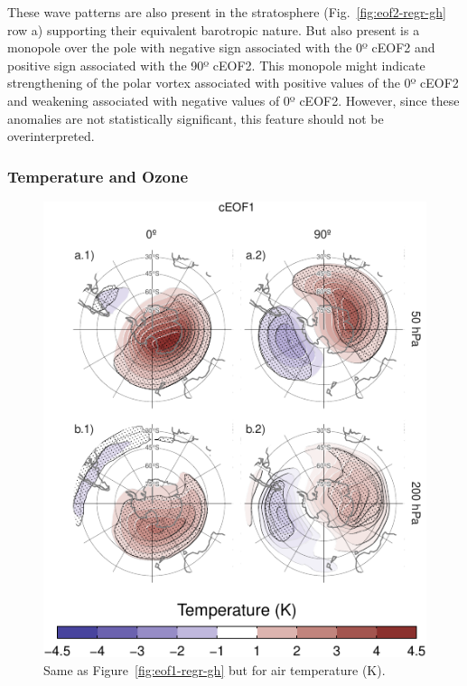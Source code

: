 \documentclass[pdflatex,lineno,sn-basic]{sn-jnl}
\theoremstyle{thmstyleone}%
\theoremstyle{thmstyletwo}%
\theoremstyle{thmstylethree}%
\begin{document}
These wave patterns are also present in the stratosphere (Fig.~\ref{fig:eof2-regr-gh} row a) supporting their equivalent barotropic nature.
But also present is a monopole over the pole with negative sign associated with the 0º cEOF2 and positive sign associated with the 90º cEOF2.
This monopole might indicate strengthening of the polar vortex associated with positive values of the 0º cEOF2 and weakening associated with negative values of 0º cEOF2.
However, since these anomalies are not statistically significant, this feature should not be overinterpreted.

\hypertarget{temp-ozone}{%
\subsubsection{Temperature and Ozone}\label{temp-ozone}}



\begin{figure}
\centering
\includegraphics{shceof_files/figure-latex/eof1-regr-t-1.pdf}
\caption{\label{fig:eof1-regr-t}Same as Figure~\ref{fig:eof1-regr-gh} but for air temperature (K).}
\end{figure}
\end{document}
